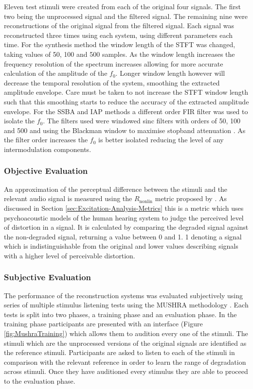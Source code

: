 			Eleven test stimuli were created from each of the original four signals. The first two being the
			unprocessed signal and the filtered signal. The remaining nine were reconstructions of the original
			signal from the filtered signal. Each signal was reconstructed three times using each system, using
			different parameters each time. For the synthesis method the window length of the STFT was changed,
			taking values of 50, 100 and 500 samples. As the window length increases the frequency resolution
			of the spectrum increases allowing for more accurate calculation of the amplitude of the $f_{0}$.
			Longer window length however will decrease the temporal resolution of the system, smoothing the
			extracted amplitude envelope. Care must be taken to not increase the STFT window length such that
			this smoothing starts to reduce the accuracy of the extracted amplitude envelope.  For the SSBA and
			IAP methods a different order FIR filter was used to isolate the $f_{0}$. The filters used were
			windowed sinc filters with orders of 50, 100 and 500 and using the Blackman window to maximise
			stopband attenuation \citep{schlichtharle2011digital}. As the filter order increases the $f_{0}$ is
			better isolated reducing the level of any intermodulation components.

		\subsubsection*{Objective Evaluation}
			An approximation of the perceptual difference between the stimuli and the relevant audio signal is
			measured using the $R_{\mathrm{nonlin}}$ metric proposed by \citet{tan2004predicting}. As discussed
			in Section \ref{sec:Excitation-Analysis-Metrics} this is a metric which uses psychoacoustic models
			of the human hearing system to judge the perceived level of distortion in a signal. It is
			calculated by comparing the degraded signal against the non-degraded signal, returning a value
			between 0 and 1. 1 denoting a signal which is indistinguishable from the original and lower values
			describing signals with a higher level of perceivable distortion.

		\subsubsection*{Subjective Evaluation}
			The performance of the reconstruction systems was evaluated subjectively using series of multiple
			stimulus listening tests using the MUSHRA methodology \citep{mushra2014}. Each tests is split into
			two phases, a training phase and an evaluation phase. In the training phase participants are
			presented with an interface (Figure \ref{fig:MushraTraining}) which allows them to audition every
			one of the stimuli. The stimuli which are the unprocessed versions of the original signals are
			identified as the reference stimuli. Participants are asked to listen to each of the stimuli in
			comparison with the relevant reference in order to learn the range of degradation across stimuli.
			Once they have auditioned every stimulus they are able to proceed to the evaluation phase.


